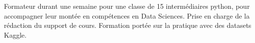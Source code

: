 Formateur durant une semaine pour une classe de 15 intermédiaires python, pour accompagner leur montée en compétences en Data Sciences.
Prise en charge de la rédaction du support de cours.
Formation portée sur la pratique avec des datasets Kaggle.

\sectionspace
